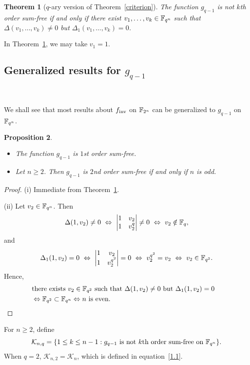 \documentclass{amsart}
\newtheorem{thm}{Theorem}[section]
\newtheorem{prop}[thm]{Proposition}
\numberwithin{equation}{section}
\theoremstyle{definition}
\newcommand{\f}{\Bbb F}
\newcommand{\fin}{f_{\text{\rm inv}}}
\begin{document}
\begin{thm}[$q$-ary version of Theorem~\ref{criterion}]\label{q-criterion}
The function $g_{q-1}$ is not $k$th order sum-free if and only if there exist $v_1,\dots,v_k\in\f_{q^n}$ such that $\Delta(v_1,\dots,v_k)\ne 0$ but $\Delta_1(v_1,\dots,v_k)=0$.
\end{thm}

 In Theorem~\ref{q-criterion}, we may take $v_1=1$.

\subsection{Generalized results for $g_{q-1}$}\

We shall see that most results about $\fin$ on $\f_{2^n}$ can be generalized to $g_{q-1}$ on $\f_{q^n}$.

\begin{prop}\label{1-2-order}\
\begin{itemize}
\item[(i)] The function $g_{q-1}$ is $1$st order sum-free.

\item[(ii)] Let $n\ge 2$. Then $g_{q-1}$ is $2$nd order sum-free if and only if $n$ is odd.
\end{itemize}
\end{prop}

\begin{proof}
(i) Immediate from Theorem~\ref{q-criterion}.

\medskip
(ii) Let $v_2\in\f_{q^n}$. Then 
\[
\Delta(1,v_2)\ne 0\ \Leftrightarrow\ \left|\begin{matrix} 1&v_2\cr 1&v_2^q\end{matrix}\right|\ne 0\ \Leftrightarrow\ v_2\notin\f_q,
\]
and 
\[
\Delta_1(1,v_2)=0\ \Leftrightarrow\ \left|\begin{matrix} 1&v_2\cr 1&v_2^{q^2}\end{matrix}\right|= 0\ \Leftrightarrow\ v_2^{q^2}=v_2\ \Leftrightarrow\  v_2\in\f_{q^2}.
\]
Hence,
\begin{align*}
&\text{there exists $v_2\in\f_{q^2}$ such that $\Delta(1,v_2)\ne 0$ but $\Delta_1(1,v_2)=0$}\cr
&\Leftrightarrow \f_{q^2}\subset\f_{q^n} \Leftrightarrow \text{$n$ is even}.
\end{align*}
\end{proof}

For $n\ge 2$, define
\[
\mathcal K_{n,q}=\{1\le k\le n-1:\text{$g_{q-1}$ is not $k$th order sum-free on $\f_{q^n}$}\}.
\]
When $q=2$, $\mathcal K_{n,2}=\mathcal K_n$, which is defined in equation~\eqref{1.1}.
\end{document}

